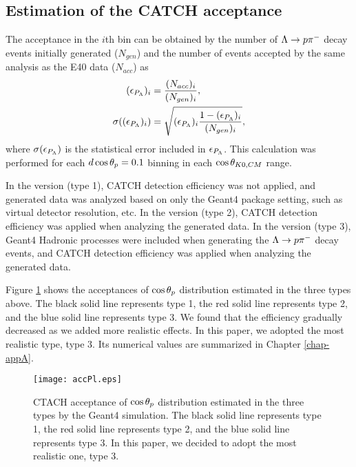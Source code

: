 \subsection{Estimation of the CATCH acceptance}
\label{sec-Pl-esteff}

The acceptance in the $i$th bin can be obtained by the number of $\Lambda\to p\pi^{-}$ decay events initially generated ($N_{gen}$) and the number of events accepted by the same analysis as the E40 data ($N_{acc}$) as
\begin{align}
  (\epsilon_{P_{\Lambda}})_i &= \frac{(N_{acc})_i}{(N_{gen})_i}, \\
  \sigma((\epsilon_{P_{\Lambda}})_i) &= \sqrt{(\epsilon_{P_{\Lambda}})_i \frac{1-(\epsilon_{P_{\Lambda}})_i}{(N_{gen})_i}},
  \label{eq-accPL}
\end{align}
where $\sigma(\epsilon_{P_{\Lambda}})$ is the statistical error included in $\epsilon_{P_{\Lambda}}$. This calculation was performed for each $d\cos{\theta_p}=0.1$ binning in each $\cos{\theta_{K0,CM}}$ range.

In the  version (type 1), CATCH detection efficiency was not applied, and generated data was analyzed based on only the Geant4 package setting, such as virtual detector resolution, etc. In the  version (type 2), CATCH detection efficiency was applied when analyzing the generated data. In the  version (type 3), Geant4 Hadronic processes were included when generating the $\Lambda\to p\pi^{-}$ decay events, and CATCH detection efficiency was applied when analyzing the generated data.

Figure \ref{fig-accPl} shows the acceptances of $\cos{\theta_p}$ distribution estimated in the three types above. The black solid line represents type 1, the red solid line represents type 2, and the blue solid line represents type 3. We found that the efficiency gradually decreased as we added more realistic effects. In this paper, we adopted the most realistic type, type 3. Its numerical values are summarized in Chapter \ref{chap-appA}.

\begin{figure}[h]
  \centering
  \texttt{[image: accPl.eps]}
  \caption{CTACH acceptance of $\cos{\theta_p}$ distribution estimated in the three types by the Geant4 simulation. The black solid line represents type 1, the red solid line represents type 2, and the blue solid line represents type 3. In this paper, we decided to adopt the most realistic one, type 3.}
  \label{fig-accPl}
\end{figure}

